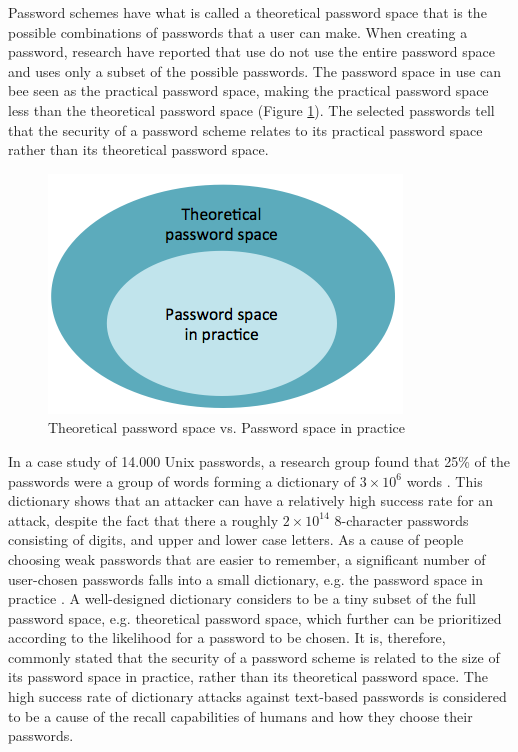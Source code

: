   Password schemes have what is called a theoretical password space that is the possible combinations of passwords that a user can make. When creating a password, research have reported that use do not use the entire password space and uses only a subset of the possible passwords. The password space in use can bee seen as the practical password space, making the practical password space less than the theoretical password space (Figure \ref{fig:memorable}).  The selected passwords tell that the security of a password scheme relates to its practical password space rather than its theoretical password space.

    \begin{figure}[H]
      \centering
      \includegraphics[scale=0.55]{pics/review/EmpiricalVsPractical.png}
      \caption{Theoretical password space vs. Password space in practice}
      \label{fig:memorable}
    \end{figure}

  In a case study of 14.000 Unix passwords, a research group found that 25\% of the passwords were a group of words forming a dictionary of $3\times10^{6}$ words \cite{UnixPasswords}. This dictionary shows that an attacker can have a relatively high success rate for an attack, despite the fact that there a roughly $2\times10^{14}$ 8-character passwords consisting of digits, and upper and lower case letters. As a cause of people choosing weak passwords that are easier to remember, a significant number of user-chosen passwords falls into a small dictionary, e.g. the password space in practice \cite{Tao}. A well-designed dictionary considers to be a tiny subset of the full password space, e.g. theoretical password space, which further can be prioritized according to the likelihood for a password to be chosen. It is, therefore, commonly stated that the security of a password scheme is related to the size of its password space in practice, rather than its theoretical password space. The high success rate of dictionary attacks against text-based passwords is considered to be a cause of the recall capabilities of humans and how they choose their passwords.

